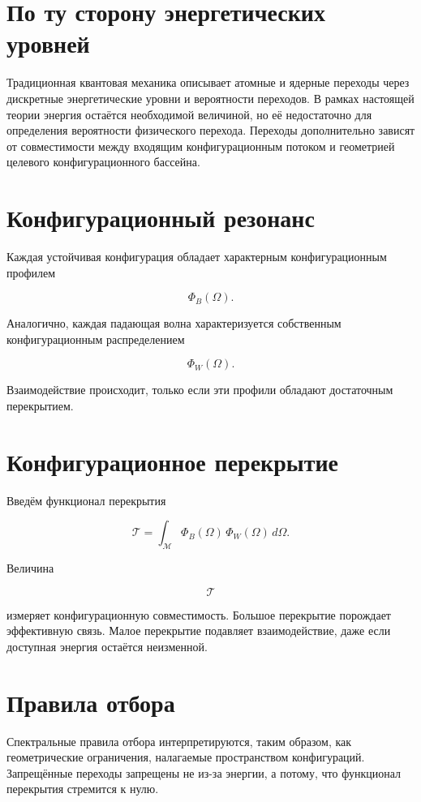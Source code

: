 \section{По ту сторону энергетических уровней}

Традиционная квантовая механика описывает атомные и ядерные переходы через дискретные энергетические уровни и вероятности переходов. В рамках настоящей теории энергия остаётся необходимой величиной, но её недостаточно для определения вероятности физического перехода. Переходы дополнительно зависят от совместимости между входящим конфигурационным потоком и геометрией целевого конфигурационного бассейна.

\section{Конфигурационный резонанс}

Каждая устойчивая конфигурация обладает характерным конфигурационным профилем

\[ \Phi_B(\Omega). \]

Аналогично, каждая падающая волна характеризуется собственным конфигурационным распределением

\[ \Phi_W(\Omega). \]

Взаимодействие происходит, только если эти профили обладают достаточным перекрытием.

\section{Конфигурационное перекрытие}

Введём функционал перекрытия

\[ \boxed{ \mathcal T = \int_{\mathcal M} \Phi_B(\Omega) \, \Phi_W(\Omega) \, d\Omega. } \]

Величина

\[ \mathcal T \]

измеряет конфигурационную совместимость. Большое перекрытие порождает эффективную связь. Малое перекрытие подавляет взаимодействие, даже если доступная энергия остаётся неизменной.

\section{Правила отбора}

Спектральные правила отбора интерпретируются, таким образом, как геометрические ограничения, налагаемые пространством конфигураций. Запрещённые переходы запрещены не из-за энергии, а потому, что функционал перекрытия стремится к нулю.

